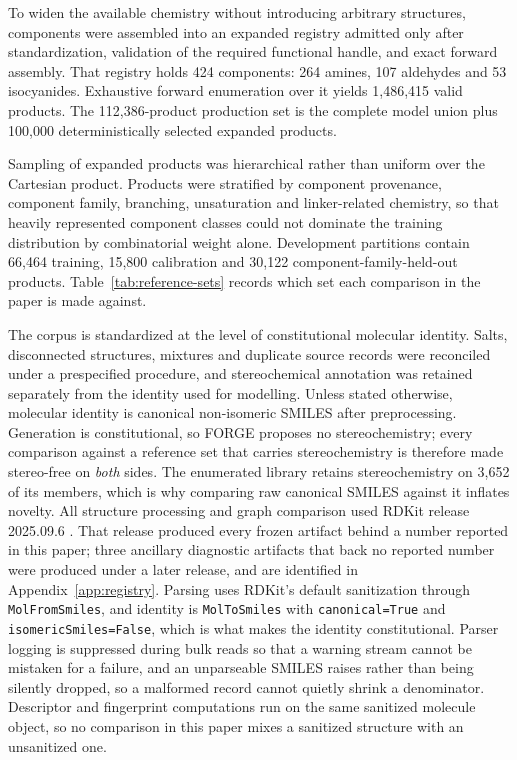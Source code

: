 \documentclass{article}
\makeatletter
\newcommand{\CorpusSize}{112{,}386}        %
\newcommand{\DevFoldSize}{66{,}464}        %
\newcommand{\AldehydeReg}{107}
\newcommand{\AmineReg}{264}
\newcommand{\IsocyanideReg}{53}
\def\paragraph{\@startsection{paragraph}{4}{\z@}{0.6ex plus 0.2ex minus .1ex}{-1em}{\normalsize\bf}}
\makeatother
\begin{document}
To widen the available chemistry without introducing arbitrary structures, components were assembled
into an expanded registry admitted only after standardization, validation of the required functional
handle, and exact forward assembly. That registry holds 424 components: \AmineReg{} amines,
\AldehydeReg{} aldehydes and \IsocyanideReg{} isocyanides. Exhaustive forward enumeration over it
yields 1,486,415 valid products. The \CorpusSize{}-product production set is the complete model union
plus 100,000 deterministically selected expanded products.

Sampling of expanded products was hierarchical rather than uniform over the Cartesian product.
Products were stratified by component provenance, component family, branching, unsaturation and
linker-related chemistry, so that heavily represented component classes could not dominate the
training distribution by combinatorial weight alone. Development partitions contain \DevFoldSize{}
training, 15,800 calibration and 30,122 component-family-held-out products. Table~\ref{tab:reference-sets}
records which set each comparison in the paper is made against.

\paragraph{Standardization and identity.}
The corpus is standardized at the level of constitutional molecular identity. Salts, disconnected
structures, mixtures and duplicate source records were reconciled under a prespecified procedure,
and stereochemical annotation was retained separately from the identity used for modelling. Unless
stated otherwise, molecular identity is canonical non-isomeric SMILES after preprocessing.
Generation is constitutional, so FORGE proposes no stereochemistry; every comparison against a
reference set that carries stereochemistry is therefore made stereo-free on \emph{both} sides. The
enumerated library retains stereochemistry on 3,652 of its members, which is why comparing raw
canonical SMILES against it inflates novelty.
All structure processing and graph comparison used RDKit release 2025.09.6
\citep{landrum2026rdkit}. That release produced every frozen artifact behind a number reported in
this paper; three ancillary diagnostic artifacts that back no reported number were produced under a
later release, and are identified in Appendix~\ref{app:registry}.
Parsing uses RDKit's default sanitization through \texttt{MolFromSmiles}, and identity is
\texttt{MolToSmiles} with \texttt{canonical=True} and \texttt{isomericSmiles=False}, which is what
makes the identity constitutional. Parser logging is suppressed during bulk reads so that a warning
stream cannot be mistaken for a failure, and an unparseable SMILES raises rather than being silently
dropped, so a malformed record cannot quietly shrink a denominator. Descriptor and fingerprint
computations run on the same sanitized molecule object, so no comparison in this paper mixes a
sanitized structure with an unsanitized one.
\end{document}
